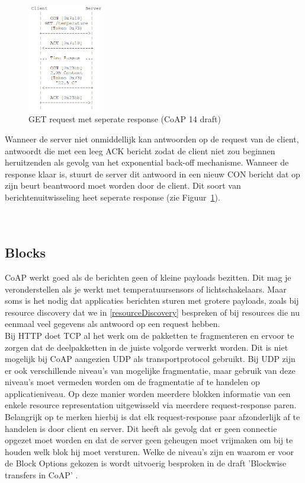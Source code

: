 \begin{figure}
\vspace{-40pt}
\includegraphics[width=0.3\textwidth]{fig/CoAPSeperateResponse}
\vspace{-30pt}
\caption{GET request met seperate response (CoAP 14 draft)}
\label{fig:SeperateResponse}
\vspace{-100pt}
\end{figure}
Wanneer de server niet onmiddellijk kan antwoorden op de request van de client, antwoordt die met een leeg ACK bericht zodat de client niet zou beginnen heruitzenden als gevolg van het exponential back-off mechanisme. Wanneer de response klaar is, stuurt de server dit antwoord in een nieuw CON bericht dat op zijn beurt beantwoord moet worden door de client. Dit soort van berichtenuitwisseling heet seperate response (zie Figuur~\ref{fig:SeperateResponse}).
\\
\\
\\

\subsection{Blocks} \label{blocks}
CoAP werkt goed als de berichten geen of kleine payloads bezitten. Dit mag je veronderstellen als je werkt met temperatuursensors of lichtschakelaars. Maar soms is het nodig dat applicaties berichten sturen met grotere payloads, zoals bij resource discovery dat we in \ref{resourceDiscovery} bespreken of bij resources die nu eenmaal veel gegevens als antwoord op een request hebben.\\

Bij HTTP doet TCP al het werk om de pakketten te fragmenteren en ervoor te zorgen dat de deelpakketten in de juiste volgorde verwerkt worden. Dit is niet mogelijk bij CoAP aangezien UDP als transportprotocol gebruikt. Bij UDP zijn er ook verschillende niveau's van mogelijke fragmentatie, maar gebruik van deze niveau's moet vermeden worden om de fragmentatie af te handelen op applicatieniveau. Op deze manier worden meerdere blokken informatie van een enkele resource representation uitgewisseld via meerdere request-response paren. Belangrijk op te merken hierbij is dat elk request-response paar afzonderlijk af te handelen is door client en server. Dit heeft als gevolg dat er geen connectie opgezet moet worden en dat de server geen geheugen moet vrijmaken om bij te houden welk blok hij moet versturen. Welke de niveau's zijn en waarom er voor de Block Options gekozen is wordt uitvoerig besproken in de draft 'Blockwise transfers in CoAP' \cite{blockwiseTransfer}.

